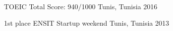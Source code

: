 



\begin{cvhonors}

  \cvhonor
    {TOEIC} %
    {Total Score: 940/1000} %
    {Tunis, Tunisia} %
    {2016} %

\end{cvhonors}




\begin{cvhonors}

  \cvhonor
	{1st place} %
	{ENSIT Startup weekend} %
	{Tunis, Tunisia} %
	{2013} %
\end{cvhonors}
